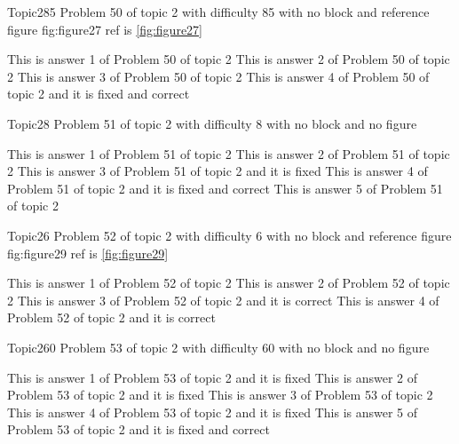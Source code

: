 \documentclass[master]{exam}
\begin{document}
\begin{problem}{Topic2}{85}
	Problem 50 of topic 2 with difficulty 85 with no block and reference figure fig:figure27 ref is \ref{fig:figure27}
	\begin{answers}
		\answer This is answer 1 of Problem 50 of topic 2 
		\answer This is answer 2 of Problem 50 of topic 2 
		\answer This is answer 3 of Problem 50 of topic 2 
		 This is answer 4 of Problem 50 of topic 2 and it is fixed and correct
	\end{answers}
\end{problem}

\begin{problem}{Topic2}{8}
	Problem 51 of topic 2 with difficulty 8 with no block and no figure
	\begin{answers}
		\answer This is answer 1 of Problem 51 of topic 2 
		\answer This is answer 2 of Problem 51 of topic 2 
		\answer[fixed] This is answer 3 of Problem 51 of topic 2 and it is fixed
		 This is answer 4 of Problem 51 of topic 2 and it is fixed and correct
		\answer This is answer 5 of Problem 51 of topic 2 
	\end{answers}
\end{problem}

\begin{problem}{Topic2}{6}
	Problem 52 of topic 2 with difficulty 6 with no block and reference figure fig:figure29 ref is \ref{fig:figure29}
	\begin{answers}
		\answer This is answer 1 of Problem 52 of topic 2 
		\answer This is answer 2 of Problem 52 of topic 2 
		\answer[correct] This is answer 3 of Problem 52 of topic 2 and it is correct
		\answer[correct] This is answer 4 of Problem 52 of topic 2 and it is correct
	\end{answers}
\end{problem}

\begin{problem}{Topic2}{60}
	Problem 53 of topic 2 with difficulty 60 with no block and no figure
	\begin{answers}
		\answer[fixed] This is answer 1 of Problem 53 of topic 2 and it is fixed
		\answer[fixed] This is answer 2 of Problem 53 of topic 2 and it is fixed
		\answer This is answer 3 of Problem 53 of topic 2 
		\answer[fixed] This is answer 4 of Problem 53 of topic 2 and it is fixed
		 This is answer 5 of Problem 53 of topic 2 and it is fixed and correct
	\end{answers}
\end{problem}
\end{document}
